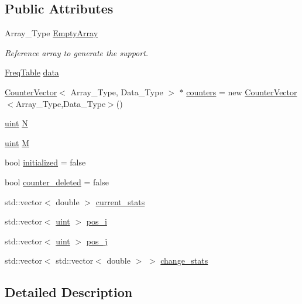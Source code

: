 \subsection*{Public Attributes}
\begin{DoxyCompactItemize}
\item 
Array\+\_\+\+Type \hyperlink{class_support_a9364028f9966697e3cdd3fc6a5cd90de}{Empty\+Array}
\begin{DoxyCompactList}\small\item\em Reference array to generate the support. \end{DoxyCompactList}\item 
\hyperlink{class_freq_table}{Freq\+Table} \hyperlink{class_support_ad399b4c1f9619c4e90dea0ffcf3c85c1}{data}
\item 
\hyperlink{class_counter_vector}{Counter\+Vector}$<$ Array\+\_\+\+Type, Data\+\_\+\+Type $>$ $\ast$ \hyperlink{class_support_a17bd2a9dca9bf7a167a47f4c8676183a}{counters} = new \hyperlink{class_counter_vector}{Counter\+Vector}$<$Array\+\_\+\+Type,Data\+\_\+\+Type$>$()
\item 
\hyperlink{typedefs_8hpp_a91ad9478d81a7aaf2593e8d9c3d06a14}{uint} \hyperlink{class_support_ab15c7125d6b99ae15ec4dbb34c9ce9b6}{N}
\item 
\hyperlink{typedefs_8hpp_a91ad9478d81a7aaf2593e8d9c3d06a14}{uint} \hyperlink{class_support_ace1d46b871c67caa774ac2269930e97f}{M}
\item 
bool \hyperlink{class_support_ac352c6473720fcdcd9895c48bd872ef5}{initialized} = false
\item 
bool \hyperlink{class_support_acb3f9a11e2c64bdea950174f7c133536}{counter\+\_\+deleted} = false
\item 
std\+::vector$<$ double $>$ \hyperlink{class_support_ada67557033378742f8592a96f39d1127}{current\+\_\+stats}
\item 
std\+::vector$<$ \hyperlink{typedefs_8hpp_a91ad9478d81a7aaf2593e8d9c3d06a14}{uint} $>$ \hyperlink{class_support_a8e3b2d36d26bb771d1a49dfaad75b966}{pos\+\_\+i}
\item 
std\+::vector$<$ \hyperlink{typedefs_8hpp_a91ad9478d81a7aaf2593e8d9c3d06a14}{uint} $>$ \hyperlink{class_support_ac256816f09e47a843cf478a470223a5b}{pos\+\_\+j}
\item 
std\+::vector$<$ std\+::vector$<$ double $>$ $>$ \hyperlink{class_support_ae6e6f53f963c1be75bea0ee9896d1afe}{change\+\_\+stats}
\end{DoxyCompactItemize}


\subsection{Detailed Description}
